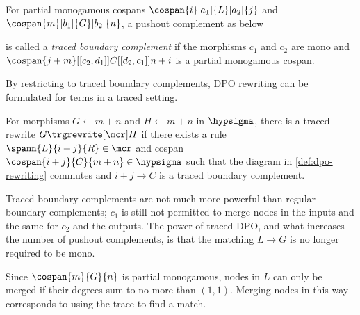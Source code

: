 \begin{definition}
    \label{def:traced-boundary-complement}
    For partial monogamous cospans \(
    \cospan{i}[a_1]{L}[a_2]{j}
    \) and \(
    \cospan{m}[b_1]{G}[b_2]{n}
    \), a pushout complement as below
    \begin{center}
    \end{center}
    is called a \emph{traced boundary complement} if the morphisms \(c_1\) and
    \(c_2\) are mono and \(
    \cospan{j + m}[[c_2,d_1]]{C}[[d_2,c_1]]{n + i}
    \) is a partial monogamous cospan.
\end{definition}

By restricting to traced boundary complements, DPO rewriting can be formulated
for terms in a traced setting.

\begin{definition}
    For morphisms \(G \leftarrow m + n\) and \(H \leftarrow m + n\) in
    \(\hypsigma\), there is a traced rewrite \(G \trgrewrite[\mcr] H\) if there
    exists a rule \(
    \spann{L}{i + j}{R} \in \mcr
    \) and cospan \(
    \cospan{i + j}{C}{m + n} \in \hypsigma
    \) such that the diagram in \cref{def:dpo-rewriting} commutes and \(i + j \to C\)
    is a traced boundary complement.
\end{definition}

Traced boundary complements are not much more powerful than regular boundary
complements; \(c_1\) is still not permitted to merge nodes in the inputs and
the same for \(c_2\) and the outputs.
The power of traced DPO, and what increases the number of pushout
complements, is that the matching \(L \to G\) is no longer required to be mono.

Since \(\cospan{m}{G}{n}\) is partial monogamous, nodes
in \(L\) can only be merged if their degrees sum to no more than \((1,1)\).
Merging nodes in this way corresponds to using the trace to find a match.

